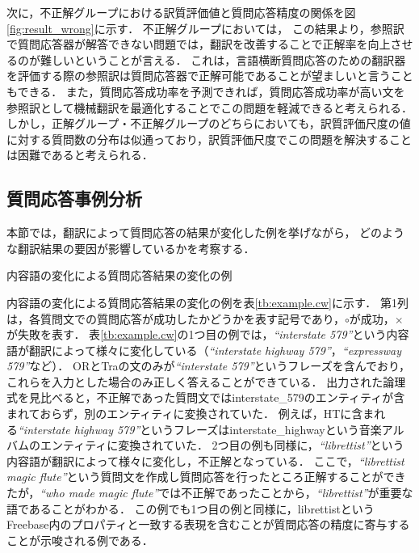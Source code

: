\documentclass[japanese]{jnlp_1.4}
\def\hl#1{}
\begin{document}
次に，不正解グループにおける訳質評価値と質問応答精度の関係を図\ref{fig:result_wrong}に示す．
不正解グループにおいては，\hl{全ての自動評価尺度において正解グループと比較して決定係数が低いという結果となった．}
この結果より，参照訳で質問応答器が解答できない問題では，翻訳を改善することで正解率を向上させるのが難しいということが言える．
これは，言語横断質問応答のための翻訳器を評価する際の参照訳は質問応答器で正解可能であることが望ましいと言うこともできる．
また，質問応答成功率を予測できれば，質問応答成功率が高い文を参照訳として機械翻訳を最適化することでこの問題を軽減できると考えられる．
しかし，正解グループ・不正解グループのどちらにおいても，訳質評価尺度の値に対する質問数の分布は似通っており，訳質評価尺度でこの問題を解決することは困難であると考えられる．


\subsection{質問応答事例分析}
\label{sec:discussion2}

本節では，翻訳によって質問応答の結果が変化した例を挙げながら，
どのような翻訳結果の要因が影響しているかを考察する．

\begin{table}[b]
\caption{{内容語の変化による質問応答結果の変化の例}}
\label{tb:example.cw}

\end{table}

内容語の変化による質問応答結果の変化の例を表{\ref{tb:example.cw}}に示す．
{第1列は，各質問文での質問応答が成功したかどうかを表す記号であり，{$\circ$}が成功，{$\times$}が失敗を表す．}
表{\ref{tb:example.cw}}の1つ目の例では，{\it ``interstate 579''}という内容語が翻訳によって様々に変化している（{\it ``interstate highway 579''}，{\it ``expressway 579''}など）．
ORとTraの文のみが{\it ``interstate 579''}というフレーズを含んでおり，これらを入力とした場合のみ正しく答えることができている．
出力された論理式を見比べると，不正解であった質問文ではinterstate\_579のエンティティが含まれておらず，別のエンティティに変換されていた．
例えば，HTに含まれる{\it ``interstate highway 579''}というフレーズはinterstate\_highwayという音楽アルバムのエンティティに変換されていた．
2つ目の例も同様に，{\it ``librettist''}という内容語が翻訳によって様々に変化し，不正解となっている．
ここで，{\it ``librettist magic flute''}という質問文を作成し質問応答を行ったところ正解することができた{が，{\it ``who made magic flute''}では不正解であったことから，{\it ``librettist''}が重要な語であることがわかる}．
この例でも1つ目の例と同様に，librettistというFreebase内のプロパティと一致する表現を含むことが質問応答の精度に寄与することが示唆される例である．
\end{document}
